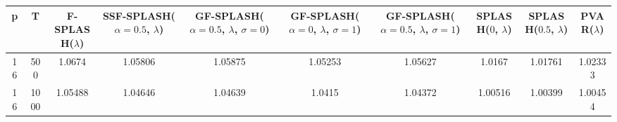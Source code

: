\begin{tabular}{cccccccccc}
\hline
  p  &  T   &  F-SPLASH($\lambda$)  &  SSF-SPLASH($\alpha=0.5$, $\lambda$)  &  GF-SPLASH($\alpha=0.5$, $\lambda$, $\sigma=0$)  &  GF-SPLASH($\alpha=0$, $\lambda$, $\sigma=1$)  &  GF-SPLASH($\alpha=0.5$, $\lambda$, $\sigma=1$)  &  SPLASH($0$, $\lambda$)  &  SPLASH($0.5$, $\lambda$)  &  PVAR($\lambda$)  \\
\hline
 16  & 500  &        1.0674         &                1.05806                &                     1.05875                      &                    1.05253                     &                     1.05627                      &          1.0167          &          1.01761           &      1.02333      \\
 16  & 1000 &        1.05488        &                1.04646                &                     1.04639                      &                     1.0415                     &                     1.04372                      &         1.00516          &          1.00399           &      1.00454      \\
\hline
\end{tabular}